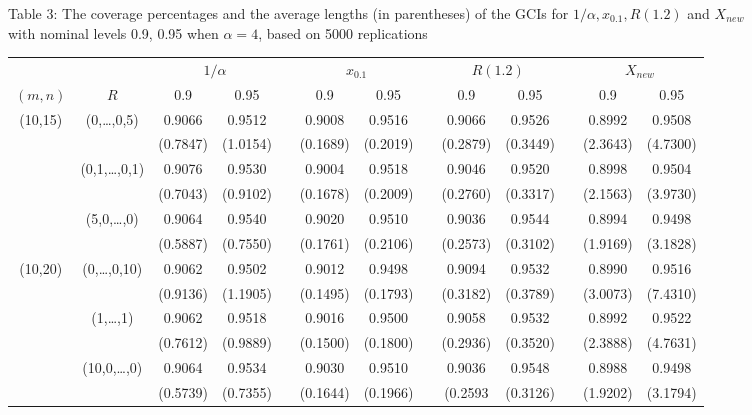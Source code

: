 \documentclass[12pt]{article}
\begin{document}
{\scriptsize
\begin{center}
{Table 3: The coverage percentages and the average lengths (in parentheses) of the GCIs for $1/\alpha, x_{0.1}, R(1.2)$ and $X_{new}$ \\with nominal levels 0.9, 0.95 when $\alpha=4$, based on 5000 replications}\\[5pt]
\begin{tabular}{ccccccccccccc}\hline
     &     &\multicolumn{2}{c}{$1/\alpha$} && \multicolumn{2}{c}{$x_{0.1}$} &&\multicolumn{2}{c}{$R(1.2)$}&&\multicolumn{2}{c}{$X_{new}$}\\\cline{3-4} \cline{6-7} \cline{9-10}\cline{12-13}
$(m,n)$ & $R$                 & 0.9    &0.95     && 0.9    &0.95    && 0.9    &0.95    && 0.9    &0.95\\ \hline
(10,15) & (0,\dots,0,5)       &0.9066  &  0.9512 &&0.9008  & 0.9516 &&0.9066  &0.9526  &&0.8992  & 0.9508\\
        &                     &(0.7847)& (1.0154)&&(0.1689)&(0.2019)&&(0.2879)&(0.3449)&&(2.3643)&(4.7300)\\
        & (0,1,\ldots,0,1)    &0.9076  &  0.9530 &&0.9004  & 0.9518 &&0.9046  & 0.9520 &&0.8998  & 0.9504\\
        &                     &(0.7043)& (0.9102)&&(0.1678)&(0.2009)&&(0.2760)&(0.3317)&&(2.1563)&(3.9730)\\
        & (5,0,\dots,0)       &0.9064  &  0.9540 &&0.9020  & 0.9510 &&0.9036  & 0.9544 &&0.8994  & 0.9498\\
        &                     &(0.5887)& (0.7550)&&(0.1761)&(0.2106)&&(0.2573)&(0.3102)&&(1.9169)&(3.1828)\\

(10,20) & (0,\dots,0,10)      &0.9062  &  0.9502 &&0.9012  & 0.9498 &&0.9094  &0.9532  &&0.8990  & 0.9516 \\
        &                     &(0.9136) & (1.1905)&&(0.1495)&(0.1793)&&(0.3182)&(0.3789)&&(3.0073)&(7.4310)\\
        & (1,\dots,1)         &0.9062  &  0.9518 &&0.9016  & 0.9500 &&0.9058  & 0.9532 &&0.8992  & 0.9522 \\
        &                     &(0.7612)& (0.9889)&&(0.1500)&(0.1800)&&(0.2936)&(0.3520)&&(2.3888)&(4.7631)\\
        & (10,0,\dots,0)      &0.9064  &  0.9534 &&0.9030  & 0.9510 &&0.9036  & 0.9548 &&0.8988  & 0.9498\\
        &                     &(0.5739)& (0.7355)&&(0.1644)&(0.1966)&&(0.2593 &(0.3126)&&(1.9202)&(3.1794)\\


\end{tabular}
\end{center}}
\end{document}
